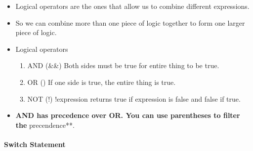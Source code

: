 \documentclass[
  paper=a4,
  ,captions=tableheading
]{scrartcl}
\providecommand{\tightlist}{%
  \setlength{\itemsep}{0pt}\setlength{\parskip}{0pt}}
\begin{document}
\begin{itemize}
\tightlist
\item
  Logical operators are the ones that allow us to combine different
  expressions.
\item
  So we can combine more than one piece of logic together to form one
  larger piece of logic.
\item
  Logical operators

  \begin{enumerate}
  \def\labelenumi{\arabic{enumi}.}
  \tightlist
  \item
    AND (\&\&) Both sides must be true for entire thing to be true.
  \item
    OR (\textbar\textbar) If one side is true, the entire thing is true.
  \item
    NOT (!) !expression returns true if expression is false and false if
    true.
  \end{enumerate}
\item
  \textbf{AND has precedence over OR. You can use parentheses to filter
  the }precendence**.
\end{itemize}

\hypertarget{switch-statement}{%
\paragraph{Switch Statement}\label{switch-statement}}
\end{document}
